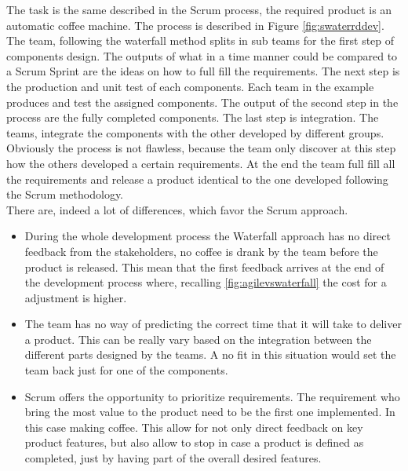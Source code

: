 \documentclass[../main.tex]{subfiles}
\begin{document}
The task is the same described in the Scrum process, the required product is an automatic coffee machine. The process is described in Figure \ref{fig:swaterrddev}. The team, following the waterfall method splits in sub teams for the first step of components design. The outputs of what in a time manner could be compared to a Scrum Sprint are the ideas on how to full fill the requirements. The next step is the production and unit test of each components. Each team in the example produces and test the assigned components. The output of the second step in the process are the fully completed components. The last step is integration. The teams, integrate the components with the other developed by different groups. Obviously the process is not flawless, because the team only discover at this step how the others developed a certain requirements. At the end the team full fill all the requirements and release a product identical to the one developed following the Scrum methodology.\\ There are, indeed a lot of differences, which favor the Scrum approach.
\begin{itemize}
    \item During the whole development process the Waterfall approach has no direct feedback from the stakeholders, no coffee is drank by the team before the product is released. This mean that the first feedback arrives at the end of the development process where, recalling \ref{fig:agilevswaterfall} the cost for a adjustment is higher. 
    \item The team has no way of predicting the correct time that it will take to deliver a product. This can be really vary based on the integration between the different parts designed by the teams. A no fit in this situation would set the team back just for one of the components. 
    \item Scrum offers the opportunity to prioritize requirements. The requirement who bring the most value to the product need to be the first one implemented. In this case making coffee. This allow for not only direct feedback on key product features, but also allow to stop in case a product is defined as completed, just by having part of the overall desired features. 
\end{itemize}
\cleardoublepage
\end{document}
